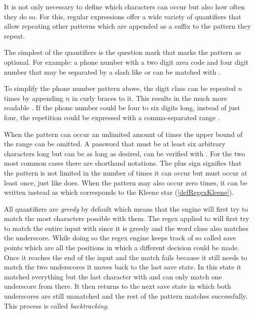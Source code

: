 It is not only necessary to define which characters can occur but also how often they do so. For this, regular expressions offer a wide variety of quantifiers that allow repeating other patterns which are appended as a suffix to the pattern they repeat.

The simplest of the quantifiers is the question mark  that marks the pattern as optional. For example: a phone number with a two digit area code and four digit number that may be separated by a slash like  or  can be matched with .

To simplify the phone number pattern above, the digit class  can be repeated $n$ times by appending $n$ in curly braces to it. This results in the much more readable . If the phone number could be four to six digits long, instead of just four, the repetition could be expressed with a comma-separated range . 

When the pattern can occur an unlimited amount of times the upper bound of the range can be omitted. A password that must be at least six arbitrary characters long but can be as long as desired, can be verified with . For the two most common cases there are shorthand notations. The plus sign \pattern{\placeholder+} signifies that the pattern is not limited in the number of times it can occur but must occur at least once, just like  does. When the pattern may also occur zero times, it can be written instead as \pattern{\placeholder*} which corresponds to the Kleene star (\ref{defRegexKleene}).

All quantifiers are \emph{greedy} by default which means that the engine will first try to match the most characters possible with them. The regex  applied to  will first try to match the entire input with  since it is greedy and the word class also matches the underscore. While doing so the regex engine keeps track of so called save points which are all the positions in which a different decision could be made. Once it reaches the end of the input and the match fails because it still needs to match the two underscores it moves back to the last save state. In this state it matched everything but the last character with  and can only match one underscore from there. It then returns to the next save state in which both underscores are still unmatched and the rest of the pattern matches successfully. This process is called \emph{backtracking}. 


